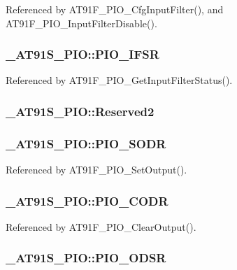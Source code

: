 Referenced by AT91F\_\-PIO\_\-CfgInputFilter(), and AT91F\_\-PIO\_\-InputFilterDisable().\hypertarget{struct__AT91S__PIO_241cdd368da6045fa14092073701c610}{
\subsubsection{ {\bf \_\-AT91S\_\-PIO::PIO\_\-IFSR}}}
\label{struct__AT91S__PIO_241cdd368da6045fa14092073701c610}




Referenced by AT91F\_\-PIO\_\-GetInputFilterStatus().\hypertarget{struct__AT91S__PIO_ff721192edce1be478138f33180ed9ed}{
\subsubsection{ {\bf \_\-AT91S\_\-PIO::Reserved2}}}
\label{struct__AT91S__PIO_ff721192edce1be478138f33180ed9ed}


\hypertarget{struct__AT91S__PIO_466a95b5a494e3c46e3d865a683b20fe}{
\subsubsection{ {\bf \_\-AT91S\_\-PIO::PIO\_\-SODR}}}
\label{struct__AT91S__PIO_466a95b5a494e3c46e3d865a683b20fe}




Referenced by AT91F\_\-PIO\_\-SetOutput().\hypertarget{struct__AT91S__PIO_01eedcf923063bcd8c2f74bf0aa4c367}{
\subsubsection{ {\bf \_\-AT91S\_\-PIO::PIO\_\-CODR}}}
\label{struct__AT91S__PIO_01eedcf923063bcd8c2f74bf0aa4c367}




Referenced by AT91F\_\-PIO\_\-ClearOutput().\hypertarget{struct__AT91S__PIO_5a38f6f03d5b58b98d47b3e0ee25f3fb}{
\subsubsection{ {\bf \_\-AT91S\_\-PIO::PIO\_\-ODSR}}}
\label{struct__AT91S__PIO_5a38f6f03d5b58b98d47b3e0ee25f3fb}




